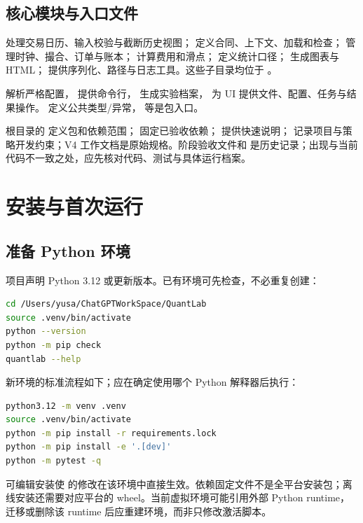 \documentclass[UTF8,fontset=none,11pt]{ctexart}
\newcommand{\chapterpage}{\par}
\let\originalsection\section
\renewcommand{\section}{\Needspace{9\baselineskip}\originalsection}
\let\originalsubsection\subsection
\renewcommand{\subsection}{\Needspace{8\baselineskip}\originalsubsection}
\begin{document}
\subsection{核心模块与入口文件}
 处理交易日历、输入校验与截断历史视图； 定义合同、上下文、加载和检查； 管理时钟、撮合、订单与账本； 计算费用和滑点； 定义统计口径； 生成图表与 HTML； 提供序列化、路径与日志工具。这些子目录均位于 。

 解析严格配置， 提供命令行， 生成实验档案， 为 UI 提供文件、配置、任务与结果操作。 定义公共类型/异常， 等是包入口。

根目录的  定义包和依赖范围； 固定已验收依赖； 提供快速说明； 记录项目与策略开发约束；V4 工作文档是原始规格。阶段验收文件和  是历史记录；出现与当前代码不一致之处，应先核对代码、测试与具体运行档案。

\chapterpage
\section{安装与首次运行}
\subsection{准备 Python 环境}
项目声明 Python 3.12 或更新版本。已有环境可先检查，不必重复创建：
\begin{lstlisting}[language=bash]
cd /Users/yusa/ChatGPTWorkSpace/QuantLab
source .venv/bin/activate
python --version
python -m pip check
quantlab --help
\end{lstlisting}
新环境的标准流程如下；应在确定使用哪个 Python 解释器后执行：
\begin{lstlisting}[language=bash]
python3.12 -m venv .venv
source .venv/bin/activate
python -m pip install -r requirements.lock
python -m pip install -e '.[dev]'
python -m pytest -q
\end{lstlisting}
可编辑安装使  的修改在该环境中直接生效。依赖固定文件不是全平台安装包；离线安装还需要对应平台的 wheel。当前虚拟环境可能引用外部 Python runtime，迁移或删除该 runtime 后应重建环境，而非只修改激活脚本。
\end{document}

